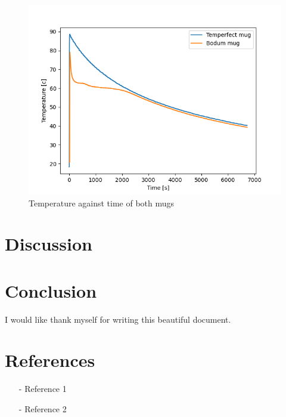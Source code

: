 \documentclass[reprint,english,notitlepage]{revtex4-2}
\begin{document}
\begin{figure}
  \includegraphics[scale=0.5]{temperature.png}
  \caption{Temperature against time of both mugs}\label{figure}
\end{figure}

\section{Discussion}
\section{Conclusion}

\begin{acknowledgments}
I would like thank myself for writing this beautiful document.
\end{acknowledgments}


\section*{References}  %
\begin{itemize}
\item[-]Reference 1
\item[-]Reference 2
\end{itemize}
\end{document}
